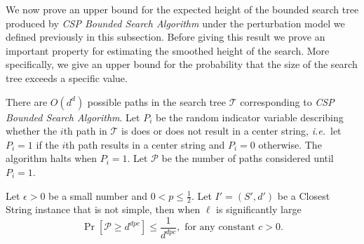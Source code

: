 We now prove an upper bound for the expected height of the bounded search tree produced by {\em CSP Bounded Search Algorithm} under the perturbation model we defined previously in this subsection.  Before giving this result we prove an important property for estimating the smoothed height of the search. More specifically, we give an upper bound for the probability that the size of the search tree exceeds a specific value.

There are $O(d^d)$ possible paths in the search tree $\mathcal{T}$ corresponding to {\em CSP Bounded Search Algorithm}.  Let $P_i$ be the random indicator variable describing whether the $i$th path in $\mathcal{T}$ is does or does not result in a center string,  {\em i.e.}\ let $P_i = 1$ if the $i$th path results in a center string and $P_i = 0$ otherwise.  The algorithm halts when $P_i = 1$. Let $\mathcal{P}$ be the number of paths considered until $P_i = 1$.  

\begin{lemma} \label{lem:bound} Let $\epsilon >0$ be a small number and $0 < p \leq \frac{1}{2}$.  Let $I' = (S', d')$ be a {\sc Closest String} instance that is not simple, then when $\ell$ is significantly large $$\Pr[ \mathcal{P} \geq d^{dpc}]\leq \frac{1}{d^{dpc}}, \, \, \mbox{for any constant $c > 0$}.$$ \end{lemma}

